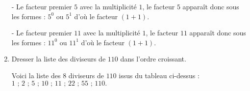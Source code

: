 \begin{corrige}
\begin{enumerate}
        - Le facteur premier $5$ avec la multiplicité $1$, le facteur $5$ apparaît donc sous les formes : $5^{0}$ ou $5^{1}$ d'où le facteur $(1+1)$.

        - Le facteur premier $11$ avec la multiplicité $1$, le facteur $11$ apparaît donc sous les formes : $11^{0}$ ou $11^{1}$ d'où le facteur $(1+1)$.
       
        \item Dresser la liste des diviseurs de $110$ dans l'ordre croissant.
        
        Voici la liste des $8$ diviseurs de $110$ issus du tableau ci-dessus : $1\text{ ; }2\text{ ; }5\text{ ; }10\text{ ; }11\text{ ; }22\text{ ; }55\text{ ; }110.$

    \end{enumerate}
\end{corrige}

